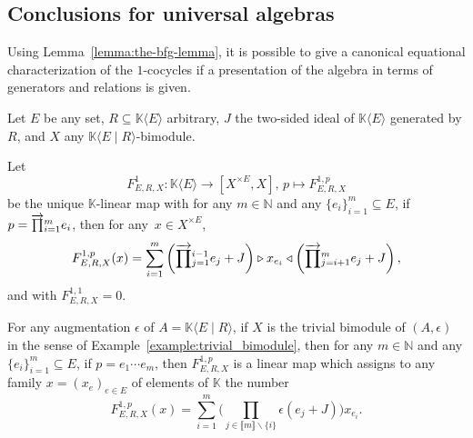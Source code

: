 \documentclass[10pt,a4paper]{amsart}
\numberwithin{equation}{section}
\newcommand{\freealg}[2]{#1\langle #2\rangle}
\newcommand{\univalg}[3]{#1\langle #2 \classpredicate #3\rangle}
\newcommand{\HSuafunc}[4]{F^{#1}_{#2,#3,#4}}
\newcommand{\HSuafuncx}[5]{F^{#1,#5}_{#2,#3,#4}}
\newcommand{\HSuafuncxx}[6]{F^{#1,#5}_{#2,#3,#4}(#6)}
\newcommand{\Scounit}{\epsilon}
\newcommand{\classpredicate}{\mid}
\newcommand{\SinternalhomX}[2]{[#1,#2]}
\newcommand{\pint}{\mathbb{N}}
\newcommand{\dwi}[1]{\llbracket{#1}\rrbracket}
\newcommand{\xfromtomaps}[5]{#1 \colon  #2 \to #3, \, #4 \mapsto #5}
\newcommand{\Sdirectproduct}{\times}
\newcommand{\Sleftmoduleaction}{\triangleright}
\newcommand{\Srightmoduleaction}{\triangleleft}
\newcommand{\tsrightwardproduct}[2]{{\overrightarrow{ \prod}}\vphantom{ \prod}_{#1}^{#2}}
\newcommand{\thegens}{E}
\newcommand{\therels}{R}
\newcommand{\theideal}{J}
\newcommand{\thefield}{\mathbb{K}}
\newcommand{\themodule}{X}
\newcommand{\thecounit}{\Scounit}
\begin{document}
\subsection{Conclusions for universal algebras}
\label{section:hochschild-particular}

{
  \newcommand{\thepolys}{\freealg{\thefield}{\thegens}}
  \newcommand{\thealgebra}{\univalg{\thefield}{\thegens}{\therels}}
  Using Lem\-ma~\ref{lemma:the-bfg-lemma}, it is possible to give a canonical equational characterization of the $1$-cocycles if a presentation of the algebra in terms of generators and relations is given.
  \begin{Assumptions}
        Let $\thegens$ be any set, $\therels\subseteq \thepolys$ arbitrary, $\theideal$ the two-sided ideal of $\thepolys$ generated by $\therels$, and $\themodule$ any $\thealgebra$-bimodule.
  \end{Assumptions}

{
  \newcommand{\somepoly}{p}
  \newcommand{\somegen}{e}
  \newcommand{\them}{m}
  \newcommand{\thees}{e}
  \newcommand{\thee}[1]{e_{#1}}
  \newcommand{\indi}{i}
  \newcommand{\indj}{j}
  \newcommand{\thetuple}{x}
  \newcommand{\thetuplex}[1]{x_{#1}}
  \newcommand{\somerel}{r}
  \newcommand{\somevector}{z}
  \begin{Definition}
    \label{definition:derivatives-one}
Let
  \[
\xfromtomaps {\HSuafunc{1}{\thegens}{\therels}{\themodule}}{\thepolys}{\SinternalhomX{\themodule^{\Sdirectproduct\thegens}}{\themodule}}{\somepoly}{\HSuafuncx{1}{\thegens}{\therels}{\themodule}{\somepoly}}
  \]
  be the unique $\thefield$-linear map with for any $\them\in\pint$ and any  $\{\thee{\indi}\}_{\indi=1}^\them\subseteq \thegens$, if $\somepoly=\tsrightwardproduct{\indi=1}{\them}{\thee{\indi}}$, then for any~${\thetuple\in \themodule^{\Sdirectproduct \thegens}}$,
  \[
    \HSuafuncxx{1}{\thegens}{\therels}{\themodule}{\somepoly}{\thetuple}=  \sum_{\indi=1}^\them \left(\tsrightwardproduct{\indj=1}{\indi-1}{\thee{\indj}}+\theideal\right)\Sleftmoduleaction\thetuplex{\thee{\indi}}\Srightmoduleaction\left(\tsrightwardproduct{\indj=\indi+1}{\them}{\thee{\indj}}+\theideal\right),
    \]
    and with $\HSuafuncx{1}{\thegens}{\therels}{\themodule}{1}=0$.
  \end{Definition}
  \begin{Example}
    \label{example:trivial_bimodule_functional}
    \newcommand{\shortalgebra}{A}
    For any augmentation $\thecounit$ of $\shortalgebra=\thealgebra$, if $\themodule$ is the trivial bimodule of $(\shortalgebra,\thecounit)$ in the sense of Example~\ref{example:trivial_bimodule}, then
    for any $\them\in\pint$ and any  $\{\thee{\indi}\}_{\indi=1}^\them\subseteq \thegens$, if $\somepoly=\thee{1}\cdots \thee{\them}$, then $\HSuafuncx{1}{\thegens}{\therels}{\themodule}{\somepoly}$ is a linear map which assigns to any family  $\thetuple=(\thetuplex{\somegen})_{\somegen\in\thegens}$ of elements of $\thefield$ the number
  \[
    \HSuafuncxx{1}{\thegens}{\therels}{\themodule}{\somepoly}{\thetuple}=  \sum_{\indi=1}^\them\Biggl(\prod_{\indj\in \dwi{\them}\backslash \{\indi\}}\thecounit\left(\thee{\indj}+\theideal\right)\Biggr)\thetuplex{\thee{\indi}}.
    \]
  \end{Example}


}}
\end{document}
